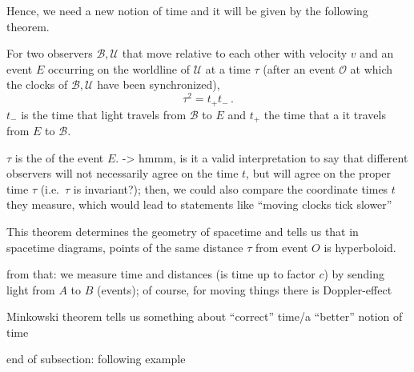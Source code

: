 Hence, we need a new notion of time and it will be given by the following theorem.


\begin{thm}
For two observers $\mathcal{B}, \mathcal{U}$ that move relative to each other with velocity $v$ and an event $E$ occurring on the worldline of $\mathcal{U}$ at a time $\tau$ (after an event $\mathcal{O}$ at which the clocks of $\mathcal{B}, \mathcal{U}$ have been synchronized),
\begin{equation}
\tau^2 = t_+ t_- \, .
\end{equation}
$t_-$ is the time that light travels from $\mathcal{B}$ to $E$ and $t_+$ the time that a it travels from $E$ to $\mathcal{B}$.
\end{thm}

$\tau$ is the  of the event $E$. -> hmmm, is it a valid interpretation to say that different observers will not necessarily agree on the time $t$, but will agree on the proper time $\tau$ (i.e.~$\tau$ is invariant?); then, we could also compare the coordinate times $t$ they measure, which would lead to statements like \enquote{moving clocks tick slower}

This theorem determines the geometry of spacetime and tells us that in spacetime diagrams, points of the same distance $\tau$ from event $O$ is hyperboloid.



from that: we measure time and distances (is time up to factor $c$) by sending light from $A$ to $B$ (events); of course, for moving things there is Doppler-effect

Minkowski theorem tells us something about \enquote{correct} time/a \enquote{better} notion of time


end of subsection: following example

